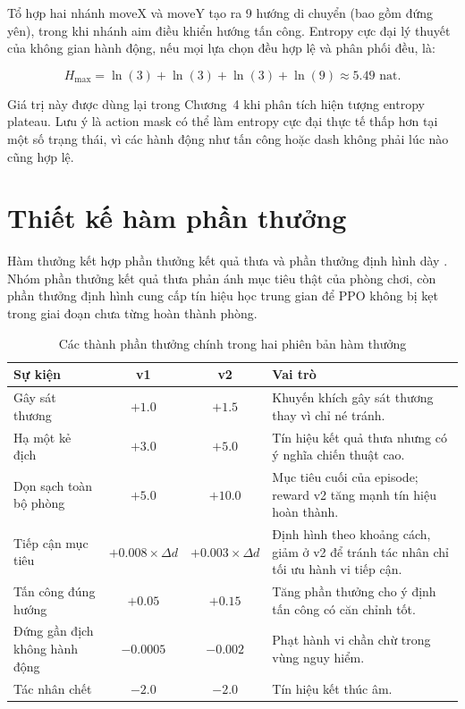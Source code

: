 Tổ hợp hai nhánh moveX và moveY tạo ra 9 hướng di chuyển (bao gồm đứng yên), trong khi nhánh aim điều khiển hướng tấn công. Entropy cực đại lý thuyết của không gian hành động, nếu mọi lựa chọn đều hợp lệ và phân phối đều, là:

\begin{equation}
    H_{\max} = \ln(3) + \ln(3) + \ln(3) + \ln(9) \approx 5.49 \text{ nat}.
    \label{eq:max_entropy}
\end{equation}

Giá trị này được dùng lại trong Chương~4 khi phân tích hiện tượng entropy plateau. Lưu ý là action mask có thể làm entropy cực đại thực tế thấp hơn tại một số trạng thái, vì các hành động như tấn công hoặc dash không phải lúc nào cũng hợp lệ.

\section{Thiết kế hàm phần thưởng}

Hàm thưởng kết hợp phần thưởng kết quả thưa và phần thưởng định hình dày \cite{Ibrahim2024}. Nhóm phần thưởng kết quả thưa phản ánh mục tiêu thật của phòng chơi, còn phần thưởng định hình cung cấp tín hiệu học trung gian để PPO không bị kẹt trong giai đoạn chưa từng hoàn thành phòng.

\begin{table}[H]
    \centering
    \small
    \caption{Các thành phần thưởng chính trong hai phiên bản hàm thưởng}
    \label{tab:reward_components}
    \begin{tabular}{|p{4.4cm}|c|c|p{5.2cm}|}
        \hline
        \textbf{Sự kiện} & \textbf{v1} & \textbf{v2} & \textbf{Vai trò} \\
        \hline
        Gây sát thương & $+1.0$ & $+1.5$ & Khuyến khích gây sát thương thay vì chỉ né tránh. \\
        \hline
        Hạ một kẻ địch & $+3.0$ & $+5.0$ & Tín hiệu kết quả thưa nhưng có ý nghĩa chiến thuật cao. \\
        \hline
        Dọn sạch toàn bộ phòng & $+5.0$ & $+10.0$ & Mục tiêu cuối của episode; reward v2 tăng mạnh tín hiệu hoàn thành. \\
        \hline
        Tiếp cận mục tiêu & $+0.008 \times \Delta d$ & $+0.003 \times \Delta d$ & Định hình theo khoảng cách, giảm ở v2 để tránh tác nhân chỉ tối ưu hành vi tiếp cận. \\
        \hline
        Tấn công đúng hướng & $+0.05$ & $+0.15$ & Tăng phần thưởng cho ý định tấn công có căn chỉnh tốt. \\
        \hline
        Đứng gần địch không hành động & $-0.0005$ & $-0.002$ & Phạt hành vi chần chừ trong vùng nguy hiểm. \\
        \hline
        Tác nhân chết & $-2.0$ & $-2.0$ & Tín hiệu kết thúc âm. \\
        \hline
    \end{tabular}
\end{table}

